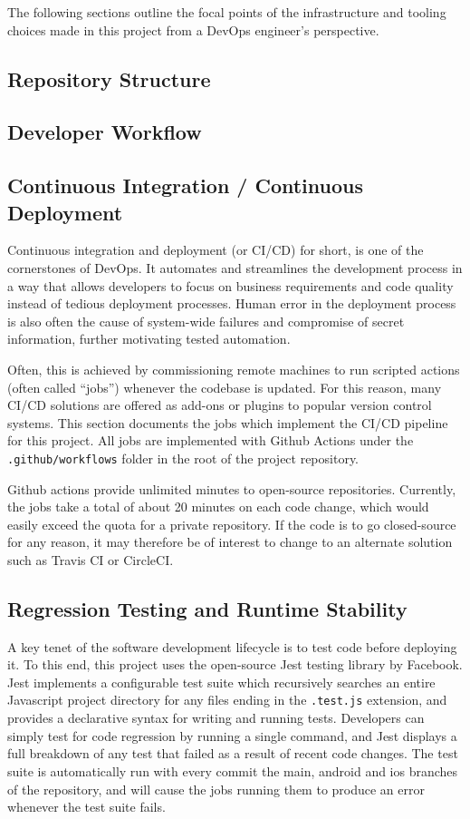 The following sections outline the focal points of the infrastructure and tooling choices made in this project from a DevOps engineer's perspective.

\subsection{Repository Structure}
\subsection{Developer Workflow}

\subsection{Continuous Integration / Continuous Deployment}
Continuous integration and deployment (or CI/CD) for short, is one of the cornerstones of DevOps. It automates and streamlines the development process in a way that allows developers to focus on business requirements and code quality instead of tedious deployment processes. Human error in the deployment process is also often the cause of system-wide failures and compromise of secret information, further motivating tested automation.

Often, this is achieved by commissioning remote machines to run scripted actions (often called ``jobs'') whenever the codebase is updated. For this reason, many CI/CD solutions are offered as add-ons or plugins to popular version control systems. This section documents the jobs which implement the CI/CD pipeline for this project. All jobs are implemented with Github Actions under the \texttt{.github/workflows} folder in the root of the project repository.

Github actions provide unlimited minutes to open-source repositories. Currently, the jobs take a total of about 20 minutes on each code change, which would easily exceed the quota for a private repository. If the code is to go closed-source for any reason, it may therefore be of interest to change to an alternate solution such as Travis CI or CircleCI.

\subsection{Regression Testing and Runtime Stability}
A key tenet of the software development lifecycle is to test code before deploying it. To this end, this project uses the open-source Jest testing library by Facebook. Jest implements a configurable test suite which recursively searches an entire Javascript project directory for any files ending in the \texttt{.test.js} extension, and provides a declarative syntax for writing and running tests. Developers can simply test for code regression by running a single command, and Jest displays a full breakdown of any test that failed as a result of recent code changes. The test suite is automatically run with every commit the main, android and ios branches of the repository, and will cause the jobs running them to produce an error whenever the test suite fails.

